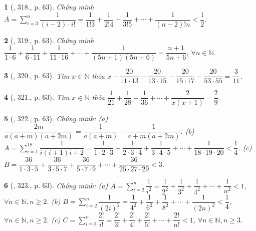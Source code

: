 \documentclass{article}
\newtheorem{baitoan}{}
\begin{document}
\begin{baitoan}[\cite{Tuyen_Toan_6}, 318., p. 63]
	Chứng minh $A = \sum_{i=3}^n \dfrac{1}{(i - 2)\cdot i!} = \dfrac{1}{1!3} + \dfrac{1}{2!4} + \dfrac{1}{3!5} + \cdots + \dfrac{1}{(n - 2)!n} < \dfrac{1}{2}$.
\end{baitoan}

\begin{baitoan}[\cite{Tuyen_Toan_6}, 319., p. 63]
	Chứng minh $\dfrac{1}{1\cdot6} + \dfrac{1}{6\cdot11} + \dfrac{1}{11\cdot16} + \cdots + \dfrac{1}{(5n + 1)(5n + 6)} = \dfrac{n + 1}{5n + 6}$, $\forall n\in\mathbb{N}$.
\end{baitoan}

\begin{baitoan}[\cite{Tuyen_Toan_6}, 320., p. 63]
	Tìm $x\in\mathbb{N}$ thỏa $x - \dfrac{20}{11\cdot13} - \dfrac{20}{13\cdot15} - \dfrac{20}{15\cdot17} - \dfrac{20}{53\cdot55} = \dfrac{3}{11}$.
\end{baitoan}

\begin{baitoan}[\cite{Tuyen_Toan_6}, 321., p. 63]
	Tìm $x\in\mathbb{N}$ thỏa $\dfrac{1}{21} + \dfrac{1}{28} + \dfrac{1}{36} + \cdots + \dfrac{2}{x(x + 1)} = \dfrac{2}{9}$.
\end{baitoan}

\begin{baitoan}[\cite{Tuyen_Toan_6}, 322., p. 63]
	Chứng minh: (a) $\dfrac{2m}{a(a + m)(a + 2m)} = \dfrac{1}{a(a + m)} - \dfrac{1}{{a + m}(a + 2m)}$. (b) $A = \sum_{i=1}^{18} \dfrac{1}{i(i + 1){i + 2}} = \dfrac{1}{1\cdot2\cdot3} + \dfrac{1}{2\cdot3\cdot4} + \dfrac{1}{3\cdot4\cdot5} + \cdots + \dfrac{1}{18\cdot19\cdot20} < \dfrac{1}{4}$. (c) $B = \dfrac{36}{1\cdot3\cdot5} + \dfrac{36}{3\cdot5\cdot7} + \dfrac{36}{5\cdot7\cdot9} + \cdots + \dfrac{36}{25\cdot27\cdot29} < 3$.
\end{baitoan}

\begin{baitoan}[\cite{Tuyen_Toan_6}, 323., p. 63]
	Chứng minh: (a) $A = \sum_{i=2}^n \dfrac{1}{i^2} = \dfrac{1}{2^2} + \dfrac{1}{3^2} + \dfrac{1}{4^2} + \cdots + \dfrac{1}{n^2} < 1$, $\forall n\in\mathbb{N},n\ge2$. (b) $B = \sum_{i=2}^n \dfrac{1}{(2i)^2} = \dfrac{1}{4^2} + \dfrac{1}{6^2} + \dfrac{1}{8^2} + \cdots + \dfrac{1}{(2n)^2} < \dfrac{1}{4}$, $\forall n\in\mathbb{N},n\ge2$. (c) $C = \sum_{i=3}^n \dfrac{2!}{i!} = \dfrac{2!}{3!} + \dfrac{2!}{4!} + \dfrac{2!}{5!} + \cdots + \dfrac{2!}{n!} < 1$, $\forall n\in\mathbb{N},n\ge3$.
\end{baitoan}
\end{document}
